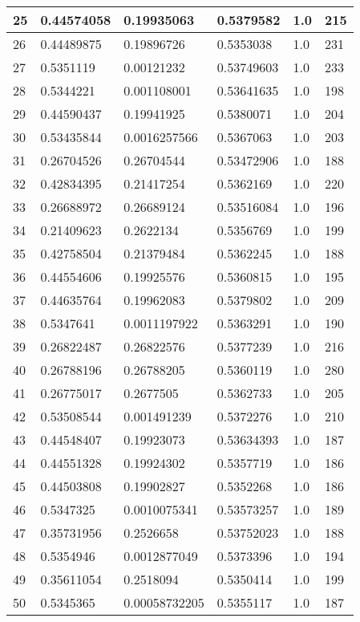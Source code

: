 \begin{longtable}{|l|l|l|l|l|l|}
25 & 0.44574058 & 0.19935063 & 0.5379582 & 1.0 & 215 \\ \hline 
26 & 0.44489875 & 0.19896726 & 0.5353038 & 1.0 & 231 \\ \hline 
27 & 0.5351119 & 0.00121232 & 0.53749603 & 1.0 & 233 \\ \hline 
28 & 0.5344221 & 0.001108001 & 0.53641635 & 1.0 & 198 \\ \hline 
29 & 0.44590437 & 0.19941925 & 0.5380071 & 1.0 & 204 \\ \hline 
30 & 0.53435844 & 0.0016257566 & 0.5367063 & 1.0 & 203 \\ \hline 
31 & 0.26704526 & 0.26704544 & 0.53472906 & 1.0 & 188 \\ \hline 
32 & 0.42834395 & 0.21417254 & 0.5362169 & 1.0 & 220 \\ \hline 
33 & 0.26688972 & 0.26689124 & 0.53516084 & 1.0 & 196 \\ \hline 
34 & 0.21409623 & 0.2622134 & 0.5356769 & 1.0 & 199 \\ \hline 
35 & 0.42758504 & 0.21379484 & 0.5362245 & 1.0 & 188 \\ \hline 
36 & 0.44554606 & 0.19925576 & 0.5360815 & 1.0 & 195 \\ \hline 
37 & 0.44635764 & 0.19962083 & 0.5379802 & 1.0 & 209 \\ \hline 
38 & 0.5347641 & 0.0011197922 & 0.5363291 & 1.0 & 190 \\ \hline 
39 & 0.26822487 & 0.26822576 & 0.5377239 & 1.0 & 216 \\ \hline 
40 & 0.26788196 & 0.26788205 & 0.5360119 & 1.0 & 280 \\ \hline 
41 & 0.26775017 & 0.2677505 & 0.5362733 & 1.0 & 205 \\ \hline 
42 & 0.53508544 & 0.001491239 & 0.5372276 & 1.0 & 210 \\ \hline 
43 & 0.44548407 & 0.19923073 & 0.53634393 & 1.0 & 187 \\ \hline 
44 & 0.44551328 & 0.19924302 & 0.5357719 & 1.0 & 186 \\ \hline 
45 & 0.44503808 & 0.19902827 & 0.5352268 & 1.0 & 186 \\ \hline 
46 & 0.5347325 & 0.0010075341 & 0.53573257 & 1.0 & 189 \\ \hline 
47 & 0.35731956 & 0.2526658 & 0.53752023 & 1.0 & 188 \\ \hline 
48 & 0.5354946 & 0.0012877049 & 0.5373396 & 1.0 & 194 \\ \hline 
49 & 0.35611054 & 0.2518094 & 0.5350414 & 1.0 & 199 \\ \hline 
50 & 0.5345365 & 0.00058732205 & 0.5355117 & 1.0 & 187 \\ \hline 
\end{longtable}
